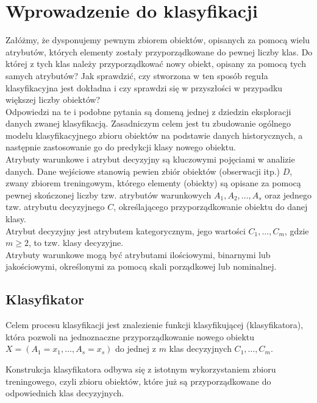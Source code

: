 \documentclass{article}
\begin{document}
\section{Wprowadzenie do klasyfikacji}

Załóżmy, że dysponujemy pewnym zbiorem obiektów, opisanych za pomocą wielu atrybutów, których elementy zostały przyporządkowane do pewnej liczby klas. Do której z tych klas należy przyporządkować nowy obiekt, opisany za pomocą tych samych atrybutów? Jak sprawdzić, czy stworzona w ten sposób reguła klasyfikacyjna jest dokładna i czy sprawdzi się w przyszłości w przypadku większej liczby obiektów? \\

Odpowiedzi na te i podobne pytania są domeną jednej z dziedzin eksploracji danych zwanej klasyfikacją. Zasadniczym celem jest tu zbudowanie ogólnego modelu klasyfikacyjnego zbioru obiektów na podstawie danych historycznych, a następnie zastosowanie go do predykcji klasy nowego obiektu. \\

Atrybuty warunkowe i atrybut decyzyjny są kluczowymi pojęciami w analizie danych. Dane wejściowe stanowią pewien zbiór obiektów (obserwacji itp.) $D$, zwany zbiorem treningowym, którego elementy (obiekty) są opisane za pomocą pewnej skończonej liczby tzw. atrybutów warunkowych $A_1, A_2, \ldots, A_s$ oraz jednego tzw. atrybutu decyzyjnego $C$, określającego przyporządkowanie obiektu do danej klasy. \\

Atrybut decyzyjny jest atrybutem kategorycznym, jego wartości $C_1, \ldots, C_m$, gdzie $m \geq 2$, to tzw. klasy decyzyjne. \\

Atrybuty warunkowe mogą być atrybutami ilościowymi, binarnymi lub jakościowymi, określonymi za pomocą skali porządkowej lub nominalnej. \\

\subsection{Klasyfikator}

Celem procesu klasyfikacji jest znalezienie funkcji klasyfikującej (klasyfikatora), która pozwoli na jednoznaczne przyporządkowanie nowego obiektu $X = (A_1 = x_1, \ldots, A_s = x_s)$ do jednej z $m$ klas decyzyjnych $C_1, \ldots, C_m$.

Konstrukcja klasyfikatora odbywa się z istotnym wykorzystaniem zbioru treningowego, czyli zbioru obiektów, które już są przyporządkowane do odpowiednich klas decyzyjnych.
\end{document}
